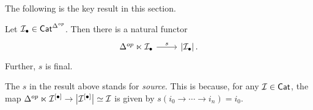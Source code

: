 \documentclass[a4paper,10pt]{article}%
\begin{document}
The following is the key result in this section.

\begin{proposition}\label{SOURCEFINAL PROP}
	Let $\mathcal{I}_{\bullet} \in \mathsf{Cat}^{\Delta^{op}}$.
	Then there is a natural functor
\begin{equation}
\begin{tikzcd}
	\Delta^{op} \ltimes \mcI_{\bullet}
	\ar{r}{s} &
	\left| \mcI_{\bullet} \right|.
\end{tikzcd}
\end{equation}
Further, $s$ is final.
\end{proposition}

\begin{remark}
	The $s$ in the result above stands for \textit{source}. 
	This is because, for any $\mathcal{I} \in \mathsf{Cat}$, the map
	$\Delta^{op} \ltimes \mathcal{I}^{[\bullet]}
	\to \left| \mathcal{I}^{[\bullet]} \right|
	\simeq \mathcal{I}$ is given by $s(i_0\to \cdots \to i_n) = i_0$.
\end{remark}
\end{document}
